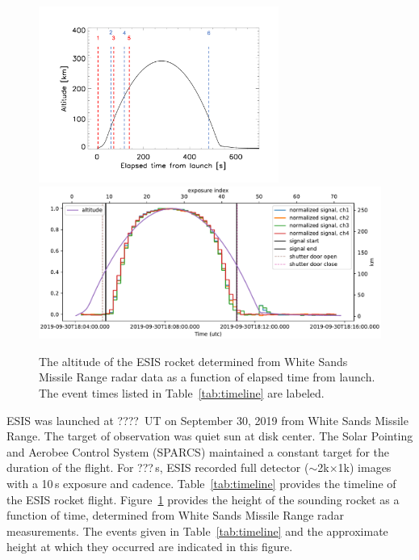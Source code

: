 		\begin{figure}[ht]
			\begin{center}
				\includegraphics[width=0.7\textwidth]{figures/altevents.png}
				\includegraphics[width=\textwidth]{figures/signal_and_altitude_vs_time}
				\caption{The altitude of the ESIS rocket determined from White Sands Missile Range radar data as a function of elapsed time from launch.  The event times listed in Table~\ref{tab:timeline} are labeled.}
				\label{fig:timeline}
			\end{center}
		\end{figure}


		ESIS was launched at ????~UT on September 30, 2019 from White Sands Missile Range.  The target of observation was quiet sun at disk center.  The Solar Pointing and Aerobee Control System (SPARCS) maintained a constant target for the duration of the flight.  For ???\,s, ESIS recorded full detector ($\sim$2k$\times$1k) images with a 10\,s exposure and cadence. %
		Table~\ref{tab:timeline} provides the timeline of the ESIS rocket flight. Figure~\ref{fig:timeline} provides the height of the sounding rocket as a function of time, determined from White Sands Missile Range radar measurements.  The events given in Table~\ref{tab:timeline} and the approximate height at which they occurred are indicated in this figure.


